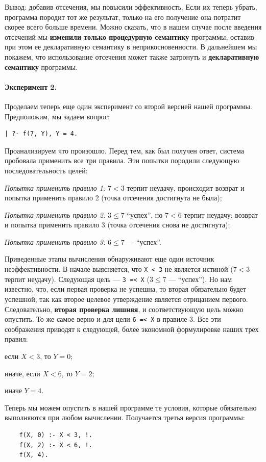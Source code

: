 \documentclass[12pt, openany, twoside]{book} %
\begin{document}
Вывод: добавив отсечения, мы повысили эффективность. Если их теперь убрать, программа породит тот же результат, только на его получение она потратит скорее всего больше времени. Можно сказать, что в нашем случае после введения отсечений мы {\bf изменили только процедурную семантику} программы, оставив при этом ее декларативную семантику в неприкосновенности. В дальнейшем мы покажем, что использование отсечения может также затронуть и {\bf декларативную семантику} программы.

\paragraph{Эксперимент 2.} Проделаем теперь еще один эксперимент со второй версией нашей программы. Предположим, мы задаем вопрос:
{\tt \begin{verbatim}
| ?- f(7, Y), Y = 4.
\end{verbatim}}
\noindent Проанализируем что произошло. Перед тем, как был получен ответ, система пробовала применить все три правила. Эти попытки породили следующую последовательность целей:

\emph{Попытка применить правило 1:}
$7 < 3$ терпит неудачу, происходит возврат и попытка применить правило 2 (точка отсечения достигнута не была);

\emph{Попытка применить правило 2:} $3\leq 7$ ``успех'', но $7 < 6$ терпит неудачу; возврат и попытка применить правило 3 (точка отсечения снова не достигнута);

\emph{Попытка применить правило 3:} {$6\leq 7$} --- ``успех''.

Приведенные этапы вычисления обнаруживают еще один источник неэффективности. В начале выясняется, что {\tt X < 3} не является истиной ($7 < 3$ терпит неудачу). Следующая цель --- {\tt 3~=<~X} ($3 \leq 7$ ---  ``успех''). Но нам известно, что, если первая проверка не успешна, то вторая обязательно будет успешной, так как второе целевое утверждение является отрицанием первого. Следовательно, {\bf вторая проверка лишняя}, и соответствующую цель можно опустить. То же самое верно и для цели {\tt 6~=<~X} в правиле 3. Все эти соображения приводят к следующей, более экономной формулировке наших трех правил:

если $X < 3$, то $Y = 0$;

иначе, если $X < 6$, то $Y = 2$;

иначе $Y = 4$.

Теперь мы можем опустить в нашей программе те условия, которые обязательно выполняются при любом вычислении. Получается третья версия программы:
{\tt \begin{verbatim}
    f(X, 0) :- X < 3, !.
    f(X, 2) :- X < 6, !.
    f(X, 4).
\end{verbatim}}
\end{document}
